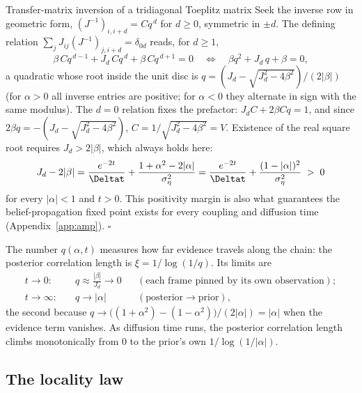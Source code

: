 \begin{toolbox}{Transfer-matrix inversion of a tridiagonal Toeplitz matrix}
Seek the inverse row in geometric form,
$(J^{-1})_{i, i+d} = C q^{\,d}$ for $d \geq 0$, symmetric in $\pm d$. The
defining relation $\sum_j J_{ij} (J^{-1})_{j, i+d} = \delta_{0d}$ reads,
for $d \geq 1$,
\begin{equation*}
  \beta\, C q^{\,d-1} + J_d\, C q^{\,d} + \beta\, C q^{\,d+1} = 0
  \quad\Longleftrightarrow\quad
  \beta q^2 + J_d\, q + \beta = 0,
\end{equation*}
a quadratic whose root inside the unit disc is
$q = (J_d - \sqrt{J_d^2 - 4\beta^2})/(2|\beta|)$ (for $\alpha > 0$ all
inverse entries are positive; for $\alpha < 0$ they alternate in sign with
the same modulus). The $d = 0$ relation fixes the prefactor:
$J_d C + 2\beta C q = 1$, and since
$2\beta q = -(J_d - \sqrt{J_d^2 - 4\beta^2})$,
$C = 1/\sqrt{J_d^2 - 4\beta^2} = V$. Existence of the real square root
requires $J_d > 2|\beta|$, which always holds here:
\begin{equation*}
  J_d - 2|\beta|
  = \frac{e^{-2t}}{\Deltat} + \frac{1 + \alpha^2 - 2|\alpha|}{\sigma_\eta^2}
  = \frac{e^{-2t}}{\Deltat} + \frac{(1 - |\alpha|)^2}{\sigma_\eta^2}
  \;>\; 0
\end{equation*}
for every $|\alpha| < 1$ and $t > 0$. This positivity margin is also what
guarantees the belief-propagation fixed point exists for every coupling
and diffusion time (Appendix~\ref{app:amp}). \hfill$\square$
\end{toolbox}

The number $q(\alpha, t)$ measures how far evidence travels along the
chain: the posterior correlation length is $\xi = 1/\log(1/q)$. Its limits
are
\begin{equation}
  \begin{aligned}
  t \to 0:&\quad q \approx \frac{|\beta|}{J_d} \to 0
  &&(\text{each frame pinned by its own observation});\\
  t \to \infty:&\quad q \to |\alpha|
  &&(\text{posterior} \to \text{prior}),
  \end{aligned}
  \label{eq:g-q-limits}
\end{equation}
the second because
$q \to \big((1+\alpha^2) - (1-\alpha^2)\big)/(2|\alpha|) = |\alpha|$ when
the evidence term vanishes. As diffusion time runs, the posterior
correlation length climbs monotonically from $0$ to the prior's own
$1/\log(1/|\alpha|)$.

\subsection{The locality law}

